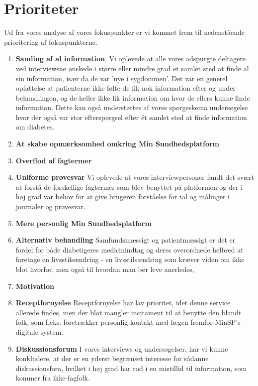 \section{Prioriteter}
Ud fra vores analyse af vores fokuspunkter er vi kommet frem til nedenstående prioritering af fokuspunkterne.\\
\begin{enumerate}
	\item \textbf{Samling af al information}. Vi oplevede at alle vores adspurgte deltagere ved interviewsne ønskede i større eller mindre grad et samlet sted at finde al sin information, især da de var 'nye i sygdommen'. Det var en generel opfattelse at patienterne ikke følte de fik nok information efter og under behandlingen, og de heller ikke fik information om hvor de ellers kunne finde information. Dette kan også understøttes af vores spørgeskema undersøgelse hvor der også var stor efterspørgsel efter ét samlet sted at finde information om diabetes.
	\item \textbf{At skabe opmærksomhed omkring Min Sundhedsplatform}
	\item \textbf{Overflod af fagtermer}
	\item \textbf{Uniforme prøvesvar} Vi oplevede at vores interviewpersoner fandt det svært at forstå de forskellige fagtermer som blev benyttet på platformen og der i høj grad var behov for at give brugeren forståelse for tal og målinger i journaler og prøvesvar.
	\item \textbf{Mere personlig Min Sundhedsplatform}
	\item \textbf{Alternativ behandling} Samfundsmæssigt og patientmæssigt er det er fordel for både diabetigeres medicinindtag og deres overordnede helbred at foretage en livsstilsændring - en livsstilsændring som kræver viden om ikke blot hvorfor, men også til hvordan man bør leve anerledes, 
	\item \textbf{Motivation}
	\item \textbf{Receptfornyelse}
        Receptfornyelse har lav prioritet, idet denne service allerede findes, men der blot mangler incitament til at benytte den blandt folk, som f.eks. foretrækker personlig kontakt med lægen fremfor MinSP's digitale system.
	\item \textbf{Diskussionsforum}
        I vores interviews og undersøgelser, har vi kunne konkludere, at der er en yderst begrænset interesse for sådanne diskussionsfora, hvilket i høj grad har rod i en mistillid til information, som kommer fra ikke-fagfolk.
\end{enumerate}
